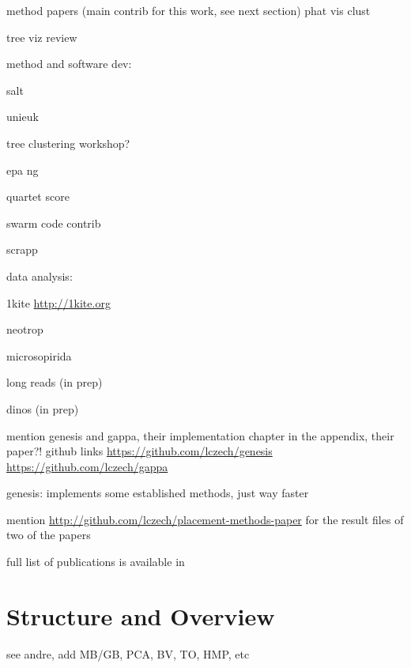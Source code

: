 method papers (main contrib for this work, see next section)
phat \cite{Czech2018}
vis clust \cite{Czech2018a}



tree viz review \cite{Czech2017}



method and software dev:

salt \cite{Flouri2017}

unieuk \cite{Berney2017}

tree clustering workshop?

epa ng \cite{Barbera2018}

quartet score \cite{Zhou2017}

swarm code contrib \cite{Mahe2014,Mahe2015}

scrapp




data analysis:

1kite \cite{Misof2014}
\url{http://1kite.org}

neotrop \cite{Mahe2017}

microsopirida \cite{Bass2018a}

long reads (in prep)

dinos (in prep)




mention genesis and gappa, their implementation chapter in the appendix,
their paper?!
github links
\url{https://github.com/lczech/genesis}
\url{https://github.com/lczech/gappa}

genesis: implements some established methods, just way faster

mention  \url{http://github.com/lczech/placement-methods-paper} for the result files of two of the papers

full list of publications is available in 


\section{Structure and Overview}
\label{ch:Introduction:sec:StructureOverview}




 see andre, add MB/GB, PCA,
BV, TO, HMP, etc


